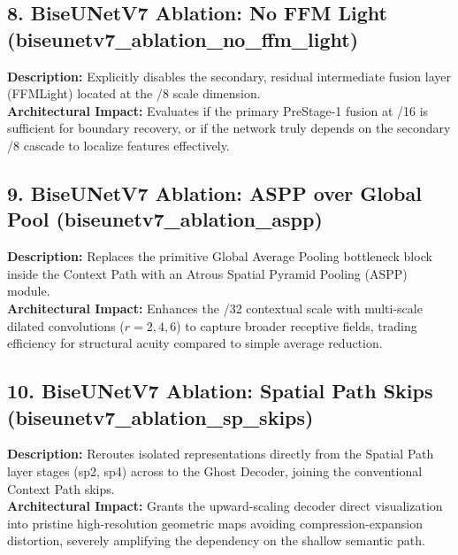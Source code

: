 \documentclass{article}
\begin{document}
\subsection{8. BiseUNetV7 Ablation: No FFM Light (biseunetv7\_ablation\_no\_ffm\_light)}
\textbf{Description:} Explicitly disables the secondary, residual intermediate fusion layer (FFMLight) located at the /8 scale dimension.
\\
\textbf{Architectural Impact:} Evaluates if the primary PreStage-1 fusion at /16 is sufficient for boundary recovery, or if the network truly depends on the secondary /8 cascade to localize features effectively. 

\subsection{9. BiseUNetV7 Ablation: ASPP over Global Pool (biseunetv7\_ablation\_aspp)}
\textbf{Description:} Replaces the primitive Global Average Pooling bottleneck block inside the Context Path with an Atrous Spatial Pyramid Pooling (ASPP) module.
\\
\textbf{Architectural Impact:} Enhances the /32 contextual scale with multi-scale dilated convolutions ($r=2, 4, 6$) to capture broader receptive fields, trading efficiency for structural acuity compared to simple average reduction.

\subsection{10. BiseUNetV7 Ablation: Spatial Path Skips (biseunetv7\_ablation\_sp\_skips)}
\textbf{Description:} Reroutes isolated representations directly from the Spatial Path layer stages (sp2, sp4) across to the Ghost Decoder, joining the conventional Context Path skips.
\\
\textbf{Architectural Impact:} Grants the upward-scaling decoder direct visualization into pristine high-resolution geometric maps avoiding compression-expansion distortion, severely amplifying the dependency on the shallow semantic path.
\end{document}
